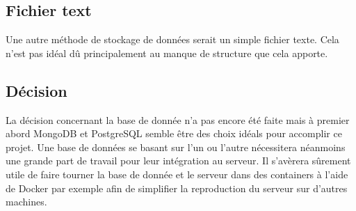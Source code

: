 \subsection{Fichier text}
Une autre méthode de stockage de données serait un simple fichier texte. Cela n'est pas idéal dû principalement au manque de structure que cela apporte.

\subsection{Décision}
La décision concernant la base de donnée n'a pas encore été faite mais à premier abord MongoDB et PostgreSQL semble être des choix idéals pour accomplir ce projet. Une base de données se basant sur l'un ou l'autre nécessitera néanmoins une grande part de travail pour leur intégration au serveur.
Il s'avèrera sûrement utile de faire tourner la base de donnée et le serveur dans des containers à l'aide de Docker par exemple afin de simplifier la reproduction du serveur sur d'autres machines.
